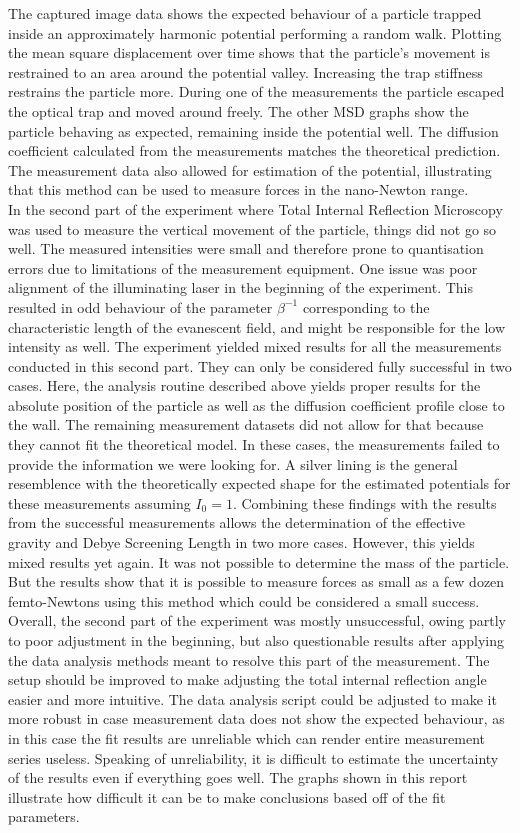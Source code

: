 \documentclass[
    twoside=false,
    twocolumn=true,
    fontsize=11pt,
]{scrarticle}
\begin{document}
The captured image data shows the expected behaviour of a particle trapped inside an approximately harmonic potential performing a random walk. Plotting the mean square displacement over time shows that the particle's movement is restrained to an area around the potential valley. Increasing the trap stiffness restrains the particle more. During one of the measurements the particle escaped the optical trap and moved around freely. The other MSD graphs show the particle behaving as expected, remaining inside the potential well. The diffusion coefficient calculated from the measurements matches the theoretical prediction. The measurement data also allowed for estimation of the potential, illustrating that this method can be used to measure forces in the nano-Newton range.\\
In the second part of the experiment where Total Internal Reflection Microscopy was used to measure the vertical movement of the particle, things did not go so well. The measured intensities were small and therefore prone to quantisation errors due to limitations of the measurement equipment. One issue was poor alignment of the illuminating laser in the beginning of the experiment. This resulted in odd behaviour of the parameter $\beta^{-1}$ corresponding to the characteristic length of the evanescent field, and might be responsible for the low intensity as well. The experiment yielded mixed results for all the measurements conducted in this second part. They can only be considered fully successful in two cases. Here, the analysis routine described above yields proper results for the absolute position of the particle as well as the diffusion coefficient profile close to the wall. The remaining measurement datasets did not allow for that because they cannot fit the theoretical model. In these cases, the measurements failed to provide the information we were looking for. A silver lining is the general resemblence with the theoretically expected shape for the estimated potentials for these measurements assuming $I_0=1$. Combining these findings with the results from the successful measurements allows the determination of the effective gravity and Debye Screening Length in two more cases. However, this yields mixed results yet again. It was not possible to determine the mass of the particle. But the results show that it is possible to measure forces as small as a few dozen femto-Newtons using this method which could be considered a small success. Overall, the second part of the experiment was mostly unsuccessful, owing partly to poor adjustment in the beginning, but also questionable results after applying the data analysis methods meant to resolve this part of the measurement. The setup should be improved to make adjusting the total internal reflection angle easier and more intuitive. The data analysis script could be adjusted to make it more robust in case measurement data does not show the expected behaviour, as in this case the fit results are unreliable which can render entire measurement series useless. Speaking of unreliability, it is difficult to estimate the uncertainty of the results even if everything goes well. The graphs shown in this report illustrate how difficult it can be to make conclusions based off of the fit parameters.\\
\end{document}
